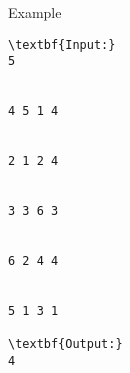 Example
\begin{verbatim}
\textbf{Input:}
5 


4 5 1 4 


2 1 2 4 


3 3 6 3 


6 2 4 4 


5 1 3 1

\textbf{Output:}
4
\end{verbatim}